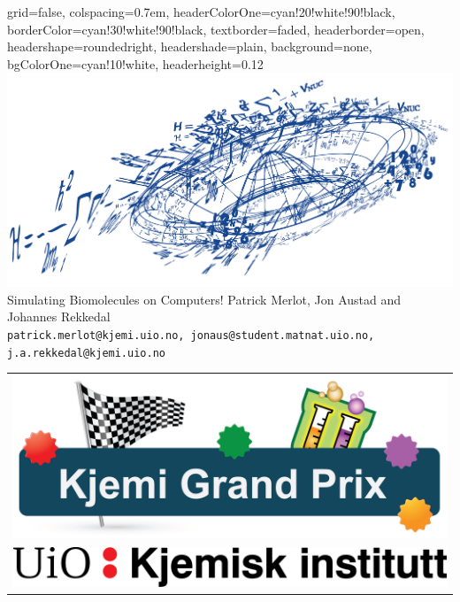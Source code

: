 \documentclass[portrait,kjemiDim,fontscale=0.292]{baposter}
\begin{document}
\begin{poster}{
 grid=false,
 colspacing=0.7em,
 headerColorOne=cyan!20!white!90!black,
 borderColor=cyan!30!white!90!black,
 textborder=faded,
 headerborder=open,
 headershape=roundedright,
 headershade=plain,
 background=none,
 bgColorOne=cyan!10!white,
 headerheight=0.12\textheight}
 {
   \includegraphics[width=0.3\linewidth]{ctcc-logo-blue.png} 
 }
 {\sc\huge  Simulating  Biomolecules on Computers! }
 {\sc\small Patrick Merlot, Jon Austad and Johannes Rekkedal\\ %
 {\sc\tiny \texttt{patrick.merlot@kjemi.uio.no, jonaus@student.matnat.uio.no, j.a.rekkedal@kjemi.uio.no}}
 }
 {
  \begin{tabular}{r}
    \includegraphics[width=0.22\linewidth]{kjemi-grand-prix-logo.jpg}\\
    \includegraphics[width=0.22\linewidth]{logo-kjemisk-institutt-enkel.png}
  \end{tabular}
 }



\end{poster}
\end{document}
